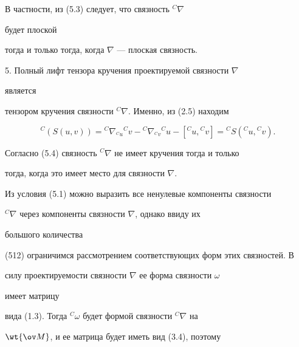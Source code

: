 В частности, из (5.3) следует, что связность ${}^C\nabla$


будет плоской


тогда и только тогда, когда $\nabla$ --- плоская связность.





5. Полный лифт тензора кручения проектируемой связности $\nabla$


является


тензором кручения связности ${}^C\nabla$. Именно, из (2.5) находим


\begin{equation}


{}^C(S(u,v))={}^C\nabla_{{}^C u}{}^C v-{}^C\nabla_{{}^C v}


{}^C u-[{}^Cu,{}^C v]={}^C S({}^C u,{}^C v).


\end{equation}


Согласно (5.4) связность ${}^C\nabla$ не имеет кручения тогда и только


тогда, когда это имеет место для связности $\nabla$.





Из условия (5.1) можно выразить все ненулевые компоненты связности


${}^C\nabla$ через компоненты связности $\nabla$, однако ввиду их


большого количества


(512) ограничимся рассмотрением соответствующих форм этих связностей. В


силу проектируемости связности $\nabla$ ее форма связности $\omega$


имеет матрицу


вида (1.3). Тогда ${}^C\omega$ будет формой связности ${}^C\nabla$ на


$\wt{\ov M}$, и ее матрица будет иметь вид (3.4), поэтому


